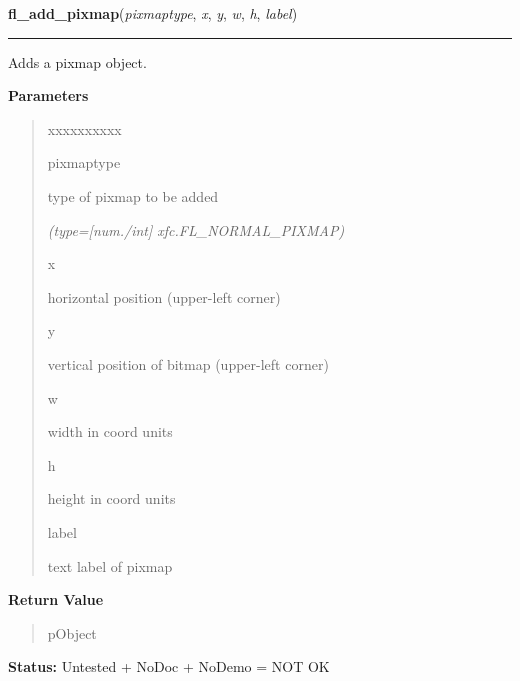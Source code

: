     \label{xformslib:library:fl_add_pixmap}

    \vspace{0.5ex}

\hspace{.8\funcindent}\begin{boxedminipage}{\funcwidth}

    \raggedright \textbf{fl\_add\_pixmap}(\textit{pixmaptype}, \textit{x}, \textit{y}, \textit{w}, \textit{h}, \textit{label})

    \vspace{-1.5ex}

    \rule{\textwidth}{0.5\fboxrule}
\setlength{\parskip}{2ex}
    Adds a pixmap object.

\setlength{\parskip}{1ex}
      \textbf{Parameters}
      \vspace{-1ex}

      \begin{quote}
        \begin{Ventry}{xxxxxxxxxx}

          \item[pixmaptype]

          type of pixmap to be added

            {\it (type=[num./int] xfc.FL\_NORMAL\_PIXMAP)}

          \item[x]

          horizontal position (upper-left corner)

          \item[y]

          vertical position of bitmap (upper-left corner)

          \item[w]

          width in coord units

          \item[h]

          height in coord units

          \item[label]

          text label of pixmap

        \end{Ventry}

      \end{quote}

      \textbf{Return Value}
    \vspace{-1ex}

      \begin{quote}
      pObject

      \end{quote}

\textbf{Status:} Untested + NoDoc + NoDemo = NOT OK



    \end{boxedminipage}

